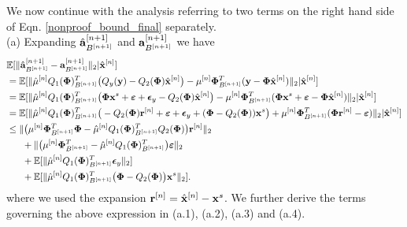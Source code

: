\documentclass{article}
\begin{document}
We now continue with the analysis referring to two terms on the right hand side of Eqn. \ref{nonproof_bound_final} separately.\\

{(a)} Expanding $\hat{{\bf a}}_{B^{[n+1]}}^{[n+1]}$ and ${{\bf a}}_{B^{[n+1]}}^{[n+1]}$ we have
\begin{equation}\label{quantization_error_terms}
    \begin{split}
      &\mathbb{E}[  \|\hat{{\bf a}}_{B^{[n+1]}}^{[n+1]} - {{\bf a}}_{B^{[n+1]}}^{[n+1]} \|_2| \hat{{\bf x}}^{[n]}] \\
      &= \mathbb{E}[\|\hat{\mu}^{[n]}Q_1({\bf {\bf \Phi}})_{B^{[n+1]}}^T\big(Q_y({\bf y})-Q_2({\bf {\bf \Phi}})\hat{{\bf x}}^{[n]}\big) - {\mu}^{[n]}{\bf {\bf \Phi}}_{B^{[n+1]}}^T({\bf y}-{\bf {\bf \Phi}}\hat{{\bf x}}^{[n]}) \|_2| \hat{{\bf x}}^{[n]}]\\
        &=\mathbb{E}[\|\hat{\mu}^{[n]}Q_1({\bf {\bf \Phi}})_{B^{[n+1]}}^T\big({\bf {\bf \Phi}} {\bf x}^s +\boldsymbol{\varepsilon}+\boldsymbol{\epsilon}_y-Q_2({\bf {\bf \Phi}})\hat{{\bf x}}^{[n]}\big) - {\mu}^{[n]}{\bf {\bf \Phi}}_{B^{[n+1]}}^T({\bf {\bf \Phi}}{\bf x}^s +\boldsymbol{\varepsilon}-{\bf {\bf \Phi}}\hat{{\bf x}}^{[n]}) \|_2| \hat{{\bf x}}^{[n]}]\\
        &=\mathbb{E}[\|\hat{\mu}^{[n]}Q_1({\bf {\bf \Phi}})_{B^{[n+1]}}^T\big(-Q_2({\bf {\bf \Phi}}) {\bf r}^{[n]} +\boldsymbol{\varepsilon}+\boldsymbol{\epsilon}_y+({\bf {\bf \Phi}}-Q_2({\bf {\bf \Phi}})){\bf x}^{s}\big)+{\mu}^{[n]}{\bf {\bf \Phi}}_{B^{[n+1]}}^T({\bf {\bf \Phi}}{\bf r}^{[n]} -\boldsymbol{\varepsilon}) \|_2| \hat{{\bf x}}^{[n]}]\\
        &\leq \|\big(\mu^{[n]}{\bf {\bf \Phi}}_{B^{[n+1]}}^T{\bf {\bf \Phi}} - \hat{\mu}^{[n]}Q_1({\bf {\bf \Phi}})_{B^{[n+1]}}^T Q_2({\bf {\bf \Phi}})\big) {\bf r}^{[n]} \|_2\\
        &\ \ \ \ \  +\|\big(\mu^{[n]}{\bf {\bf \Phi}}_{B^{[n+1]}}^T - \hat{\mu}^{[n]}Q_1({\bf {\bf \Phi}})_{B^{[n+1]}}^T \big)\boldsymbol{\varepsilon} \|_2\\
     &\ \ \ \  \  +\mathbb{E}[\|\hat{\mu}^{[n]}Q_1({\bf {\bf \Phi}})_{B^{[n+1]}}^T\boldsymbol{\epsilon}_y \|_2]\\
     &\ \ \ \  \  +\mathbb{E}[\| \hat{\mu}^{[n]}Q_1({\bf \Phi})_{B^{[n+1]}}^T\big({\bf {\bf \Phi}}-Q_2({\bf {\bf \Phi}})\big){\bf x}^s \|_2].
    \end{split}
\end{equation} where we used the expansion ${{\bf r}}^{[n]} = \hat{{\bf x}}^{[n]}-{\bf x}^s$. We further derive the terms governing the above expression in (a.1), (a.2), (a.3) and (a.4). \\
\end{document}
